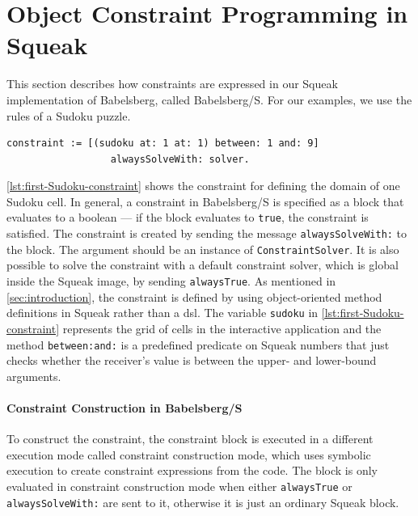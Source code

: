 \section{Object Constraint Programming in Squeak}
\label{sec:ocp_squeak}

This section describes how constraints are expressed in our Squeak
implementation of Babelsberg, called Babelsberg/S. For our examples,
we use the rules of a Sudoku puzzle.

\begin{lstlisting}[caption=Defining the domain of a Sudoku cell, label=lst:first-Sudoku-constraint]
constraint := [(sudoku at: 1 at: 1) between: 1 and: 9]
                  alwaysSolveWith: solver.
\end{lstlisting}

\autoref{lst:first-Sudoku-constraint} shows the constraint for
defining the domain of one Sudoku cell. In general, a constraint in
Babelsberg/S is specified as a block that evaluates to a boolean ---
if the block evaluates to \texttt{true}, the constraint is satisfied.
The constraint is created by sending the message
\texttt{alwaysSolveWith:} to the block. The argument should be an
instance of \texttt{ConstraintSolver}. It is also possible to solve
the constraint with a default constraint solver, which is global
inside the Squeak image, by sending \texttt{alwaysTrue}. As mentioned
in \autoref{sec:introduction}, the constraint is defined by using
object-oriented method definitions in Squeak rather than a
\ac{dsl}. The variable \texttt{sudoku} in
\autoref{lst:first-Sudoku-constraint} represents the grid of cells in
the interactive application and the method \texttt{between:and:} is a
predefined predicate on Squeak numbers that just checks whether the
receiver's value is between the upper- and lower-bound arguments.

\paragraph{Constraint Construction in Babelsberg/S}
\label{sec:constr-constr}

To construct the constraint, the constraint block is executed in a
different execution mode called constraint construction mode, which
uses symbolic execution \cite{clarke1976system,king1976symbolic} to
create constraint expressions from the code. The block is only
evaluated in constraint construction mode when either
\texttt{alwaysTrue} or \texttt{alwaysSolveWith:} are sent to it,
otherwise it is just an ordinary Squeak block.


